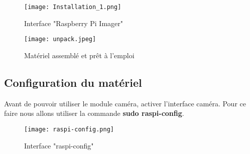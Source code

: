         \begin{figure}[ht]
            \centering
            \texttt{[image: Installation\_1.png]} 
            \caption{Interface "Raspberry Pi Imager"}
        \end{figure}

        \begin{figure}[ht]
            \centering
            \texttt{[image: unpack.jpeg]} 
            \caption{Matériel assemblé et prêt à l'emploi}
        \end{figure}
 
        \subsection{Configuration du matériel}
        Avant de pouvoir utiliser le module caméra, activer l'interface caméra.
        Pour ce faire nous allons utiliser la commande \textbf{sudo raspi-config}.

        \begin{figure}[ht]
            \centering
            \texttt{[image: raspi-config.png]} 
            \caption{Interface "raspi-config"}
        \end{figure}

